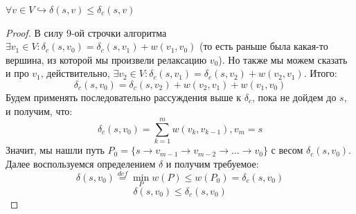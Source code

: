 \Lm $\forall v \in V \hookrightarrow \delta(s, v) \leq \delta_c(s, v)$

\begin{proof}
    В силу 9-ой строчки алгоритма $\exists v_1 \in V: \delta_c(s, v_0) = \delta_c(s, v_1) + w(v_1, v_0)$ (то есть раньше была какая-то вершина, из которой мы произвели релаксацию $v_0$). Но также мы можем сказать и про $v_1$, действительно, $\exists v_2 \in V: \delta_c(s, v_1) = \delta_c(s, v_2) + w(v_2, v_1)$. Итого:
    \begin{equation*}
        \delta_c(s, v_0) = \delta_c(s, v_2) + w(v_2, v_1) + w(v_1, v_0)
    \end{equation*}
    Будем применять последовательно рассуждения выше к $\delta_c$, пока не дойдем до $s$, и получим, что:
    \begin{equation*}
        \delta_c(s, v_0) = \sum\limits_{k=1}^{m} w(v_{k}, v_{k - 1}), v_m = s
    \end{equation*}
    Значит, мы нашли путь $P_0 = \{s \rightarrow v_{m - 1} \rightarrow v_{m - 2} \rightarrow \dots \rightarrow v_0\}$ с весом $\delta_c(s, v_0)$. Далее воспользуемся определением $\delta$ и получим требуемое:
    \begin{equation*}
        \delta(s, v_0) \overset{def}{=} \min\limits_{P} w(P) \leq w(P_0) = \delta_c(s, v_0)
    \end{equation*}
    \begin{equation*}
        \delta(s, v_0) \leq \delta_c(s, v_0)
    \end{equation*}
\end{proof}

